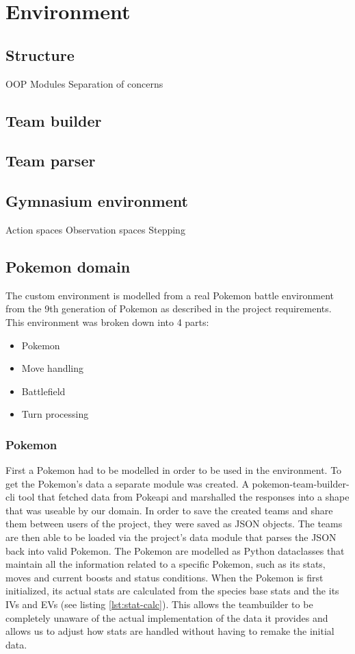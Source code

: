 \section{Environment}
\label{sec:environment}

\subsection{Structure}
OOP
Modules
Separation of concerns

\subsection{Team builder}

\subsection{Team parser}

\subsection{Gymnasium environment}
Action spaces
Observation spaces
Stepping

\subsection{Pokemon domain}
The custom environment is modelled from a real Pokemon battle environment from the 9th generation of Pokemon as described in the project requirements.
This environment was broken down into 4 parts:
\begin{itemize}
    \item Pokemon
    \item Move handling
    \item Battlefield
    \item Turn processing
\end{itemize}

\subsubsection{Pokemon}
First a Pokemon had to be modelled in order to be used in the environment.
To get the Pokemon's data a separate module was created. A pokemon-team-builder-cli \cite{TeambuilderCli} tool that
fetched data from Pokeapi \cite{PokeAPI} and marshalled the responses into a shape that was useable by our domain.
In order to save the created teams and share them between users of the project, they were saved as JSON objects.
The teams are then able to be loaded via the project's data module that parses the JSON back into valid Pokemon.
The Pokemon are modelled as Python dataclasses that maintain all the information related to a specific Pokemon, such as
its stats, moves and current boosts and status conditions. When the Pokemon is first initialized, its actual stats
are calculated from the species base stats and the its IVs and EVs (see listing \ref{lst:stat-calc}). This allows the teambuilder to be
completely unaware of the actual implementation of the data it provides and allows us to adjust how stats are handled
without having to remake the initial data.

